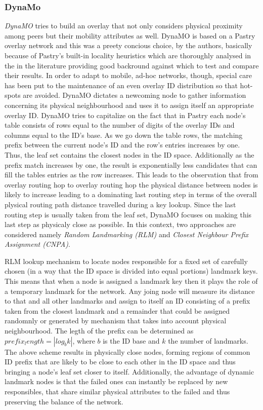 \subsubsection{DynaMo}
\emph{DynaMO} \cite{WZS2004} tries to build an overlay that not only 
considers physical proximity among peers but their mobility attributes as well.
DynaMO is based on a Pastry overlay network and this was a preety concious
choice, by the authors, basically because of Pastry's built-in locality
heuristics which are thoroughly analysed in the in the literature
\cite{CDCR2002a} providing good backround against which to test and compare
their results. In order to adapt to mobile, ad-hoc networks, though, special
care has been put to the maintenance of an even overlay ID distribution so that
hot-spots are avoided. DynaMO dictates a newcoming node to gather information
concerning its physical neighbourhood and uses it to assign itself an
appropriate overlay ID. DynaMO tries to capitalize on the fact that in Pastry
each node's table consists of rows equal to the number of digits of the overlay
IDs and columns equal to the ID's base. As we go down the table rows, the
matching prefix between the current node's ID and the row's entries increases by
one. Thus, the leaf set contains the closest nodes in the ID space. Additionally
as the prefix match increases by one, the result is exponentially less
candidates that can fill the tables entries as the row increases. This leads to
the observation \cite{antony_pastry_2001,CDCR2002a} that from overlay routing
hop to overlay routing hop the physical distance between nodes is likely to
increase leading to a dominating last routing step in terms of the overall
plysical routing path distance travelled during a key lookup. Since the last
routing step is usually taken from the leaf set, DynaMO focuses on making this
last step as physicaly close as possible. In this context, two approaches are
considered namely \emph{Random Landmarking (RLM)} and \emph{Closest Neighbour
Prefix Assignment (CNPA)}.

RLM lookup mechanism to locate nodes responsible for a fixed set of carefully
chosen (in a way that the ID space is divided into equal portions) landmark
keys. This means that when a node is assigned a landmark key then it plays the
role of a temporary landmark for the network. Any joing node will measure its
distance to that and all other landmarks and assign to itself an ID consisting
of a prefix taken from the closest landmark and a remainder that could be
assigned randomnly or generated by mechanism that takes into account physical
neighbourhood. The legth of the prefix can be determined as
$prefix_length=|log_b k|$, where $b$ is the ID base and $k$ the number of
landmarks. The above scheme results in physically close nodes, forming regions
of common ID prefix that are likely to be close to each other in the ID space
and thus bringing a node's leaf set closer to itself. Additionally, the
advantage of dynamic landmark nodes is that the failed ones can instantly be
replaced by new responsibles, that share similar physical attributes to the
failed and thus preserving the balance of the network.

